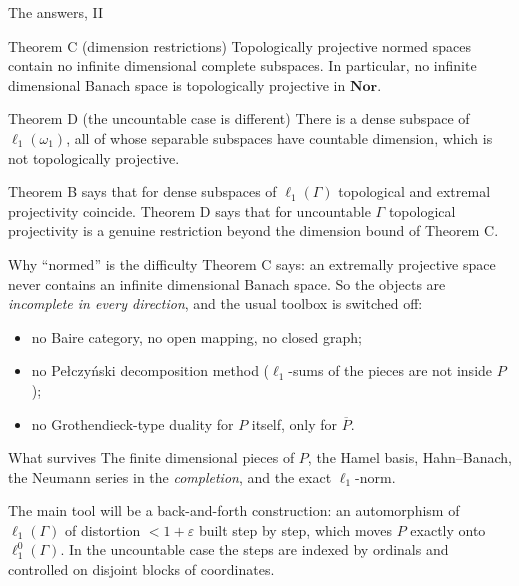 \documentclass[10pt,aspectratio=169]{beamer}
\newcommand{\Nor}{\mathbf{Nor}}
\newcommand{\lo}[1]{\ell_1^0(#1)}
\newcommand{\ellone}[1]{\ell_1(#1)}
\begin{document}
\begin{frame}{The answers, II}
  \begin{block}{Theorem C (dimension restrictions)}
    Topologically projective normed spaces contain no infinite dimensional
    complete subspaces. In particular, no infinite dimensional Banach space is
    topologically projective in $\Nor$.
  \end{block}
  \begin{block}{Theorem D (the uncountable case is different)}
    There is a dense subspace of $\ellone{\omega_1}$, all of whose separable
    subspaces have countable dimension, which is not topologically projective.
  \end{block}
  \medskip
  Theorem B says that for dense subspaces of $\ellone\Gamma$ topological and
  extremal projectivity coincide. Theorem D says that for uncountable $\Gamma$
  topological projectivity is a genuine restriction beyond the dimension bound
  of Theorem C.
\end{frame}

\begin{frame}{Why ``normed'' is the difficulty}
  Theorem C says: an extremally projective space never contains an infinite
  dimensional Banach space. So the objects are \emph{incomplete in every
  direction}, and the usual toolbox is switched off:
  \begin{itemize}
    \item no Baire category, no open mapping, no closed graph;
    \item no Pe{\l}czy\'nski decomposition method ($\ell_1$-sums of the pieces
      are not inside $P$);
    \item no Grothendieck-type duality for $P$ itself, only for $\overline P$.
  \end{itemize}
  \medskip
  \begin{alertblock}{What survives}
    The finite dimensional pieces of $P$, the Hamel basis, Hahn--Banach, the
    Neumann series in the \emph{completion}, and the exact $\ell_1$-norm.
  \end{alertblock}
  \medskip
  The main tool will be a \alert{back-and-forth construction}: an automorphism of
  $\ellone\Gamma$ of distortion $<1+\varepsilon$ built step by step, which moves
  $P$ exactly onto $\lo\Gamma$. In the uncountable case the steps are indexed by
  ordinals and controlled on disjoint blocks of coordinates.
\end{frame}

\end{document}

